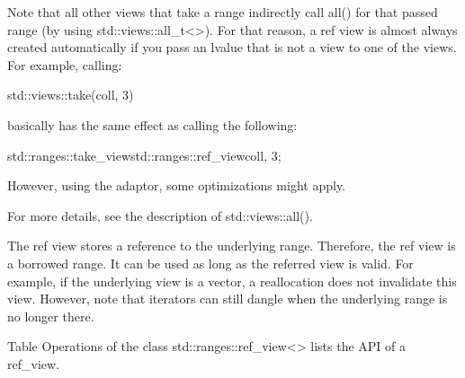 Note that all other views that take a range indirectly call all() for that passed range (by using std::views::all\_t<>). For that reason, a ref view is almost always created automatically if you pass an lvalue that is not a view to one of the views. For example, calling:

\begin{cpp}
std::views::take(coll, 3)
\end{cpp}

basically has the same effect as calling the following:

\begin{cpp}
std::ranges::take_view{std::ranges::ref_view{coll}, 3};
\end{cpp}

However, using the adaptor, some optimizations might apply.

For more details, see the description of std::views::all().


The ref view stores a reference to the underlying range. Therefore, the ref view is a borrowed range. It can be used as long as the referred view is valid. For example, if the underlying view is a vector, a reallocation does not invalidate this view. However, note that iterators can still dangle when the underlying range is no longer there.



Table Operations of the class std::ranges::ref\_view<> lists the API of a ref\_view.

